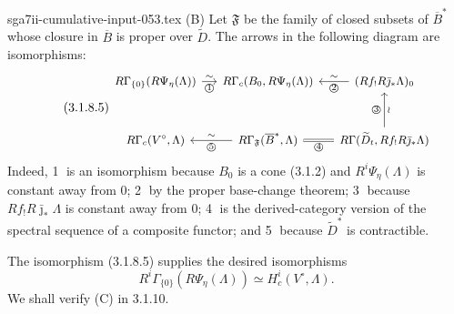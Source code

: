 \begin{filecontents*}{sga7ii-cumulative-input-053.tex}
\medskip
\noindent\textup{(B)}
Let $\mathfrak F$ be the family of closed subsets of $\overline B^*$
whose closure in $\overline B$ is proper over $\widetilde D$.  The
arrows in the following diagram are isomorphisms:
\begin{equation}\tag{3.1.8.5}
\begin{tikzcd}[column sep=small,row sep=large,cells={nodes={font=\small}}]
R\Gamma_{\{0\}}(R\Psi_\eta(\Lambda))
  \arrow[r,"\sim","\text{\textcircled{1}}"']
  & R\Gamma_c(B_0,R\Psi_\eta(\Lambda))
  & (Rf_!R\bar\jmath_*\Lambda)_0
      \arrow[l,"\sim"',"\text{\textcircled{2}}"] \\
R\Gamma_c(V^\circ,\Lambda)
  & R\Gamma_{\mathfrak F}(\overline B^*,\Lambda)
      \arrow[l,"\sim"',"\text{\textcircled{5}}"]
      \arrow[r,equal,"\text{\textcircled{4}}"']
  & R\Gamma(\widetilde D_t,Rf_!R\bar\jmath_*\Lambda)
      \arrow[u,"\text{\textcircled{3}}","\wr"']
\end{tikzcd}
\end{equation}
Indeed, \textcircled{1} is an isomorphism because $B_0$ is a cone
(3.1.2) and $R^i\Psi_\eta(\Lambda)$ is constant away from $0$;
\textcircled{2} by the proper base-change theorem;
\textcircled{3} because $Rf_!R\bar\jmath_*\Lambda$ is constant away
from $0$; \textcircled{4} is the derived-category version of the
spectral sequence of a composite functor; and \textcircled{5} because
$\widetilde D^*$ is contractible.

The isomorphism (3.1.8.5) supplies the desired isomorphisms
\begin{equation}\tag{3.1.8.6}
R^i\Gamma_{\{0\}}(R\Psi_\eta(\Lambda))
\simeq H_c^i(V^\circ,\Lambda).
\end{equation}
We shall verify (C) in 3.1.10.

\end{filecontents*}
